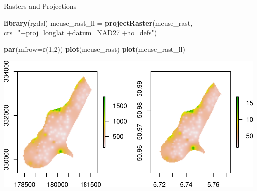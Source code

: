 \documentclass[11pt,ignorenonframetext,]{beamer}
\newenvironment{Shaded}{}{}
\newcommand{\DataTypeTok}[1]{\textcolor[rgb]{0.56,0.13,0.00}{#1}}
\newcommand{\DecValTok}[1]{\textcolor[rgb]{0.25,0.63,0.44}{#1}}
\newcommand{\KeywordTok}[1]{\textcolor[rgb]{0.00,0.44,0.13}{\textbf{#1}}}
\newcommand{\NormalTok}[1]{#1}
\newcommand{\StringTok}[1]{\textcolor[rgb]{0.25,0.44,0.63}{#1}}
\let\oldShaded\Shaded
\let\endoldShaded\endShaded
\renewenvironment{Shaded}{\footnotesize\begin{spacing}{0.9}\oldShaded}{\endoldShaded\end{spacing}}
\let\oldverbatim\verbatim
\let\endoldverbatim\endverbatim
\newcommand{\scriptoutput}{
  \renewenvironment{Shaded}{\scriptsize\begin{spacing}{0.9}\oldShaded}{\endoldShaded\end{spacing}}
  \renewenvironment{verbatim}{\scriptsize\begin{spacing}{0.9}\oldverbatim}{\endoldverbatim\end{spacing}}
}
\begin{document}
\begin{frame}[fragile,t]{Rasters and Projections}
\protect\hypertarget{rasters-and-projections}{}

\scriptoutput

\begin{Shaded}
\begin{Highlighting}[]
\KeywordTok{library}\NormalTok{(rgdal)}
\NormalTok{meuse_rast_ll =}\StringTok{ }\KeywordTok{projectRaster}\NormalTok{(meuse_rast, }\DataTypeTok{crs=}\StringTok{"+proj=longlat +datum=NAD27 +no_defs"}\NormalTok{)}

\KeywordTok{par}\NormalTok{(}\DataTypeTok{mfrow=}\KeywordTok{c}\NormalTok{(}\DecValTok{1}\NormalTok{,}\DecValTok{2}\NormalTok{))}
\KeywordTok{plot}\NormalTok{(meuse_rast)}
\KeywordTok{plot}\NormalTok{(meuse_rast_ll)}
\end{Highlighting}
\end{Shaded}

\begin{center}\includegraphics[width=\textwidth]{Lec16_files/figure-beamer/unnamed-chunk-44-1} \end{center}

\end{frame}
\end{document}
